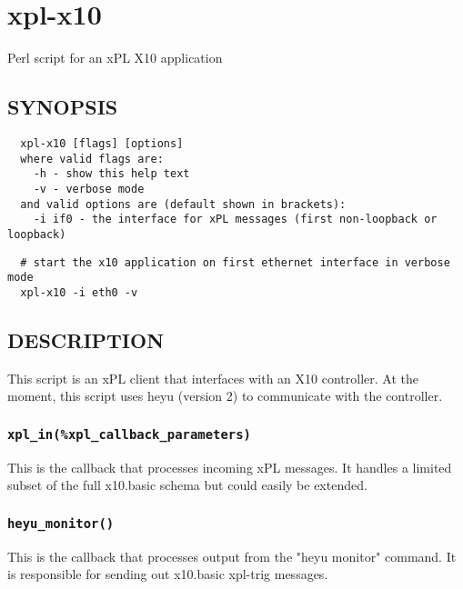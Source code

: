 \documentclass[12pt,a4paper]{article}
\begin{document}
\newpage
\section{xpl-x10\label{xpl-x10}}


Perl script for an xPL X10 application

\subsection*{SYNOPSIS\label{xpl-x10_SYNOPSIS}}
\begin{verbatim}
  xpl-x10 [flags] [options]
  where valid flags are:
    -h - show this help text
    -v - verbose mode
  and valid options are (default shown in brackets):
    -i if0 - the interface for xPL messages (first non-loopback or loopback)
\end{verbatim}
\begin{verbatim}
  # start the x10 application on first ethernet interface in verbose mode
  xpl-x10 -i eth0 -v
\end{verbatim}
\subsection*{DESCRIPTION\label{xpl-x10_DESCRIPTION}}


This script is an xPL client that interfaces with an X10 controller.
At the moment, this script uses heyu (version 2) to communicate with
the controller.

\subsubsection*{\texttt{xpl\_in(\%xpl\_callback\_parameters)}\label{xpl-x10_xpl_in_xpl_callback_parameters_}}


This is the callback that processes incoming xPL messages.  It handles
a limited subset of the full x10.basic schema but could easily be
extended.

\subsubsection*{\texttt{heyu\_monitor()}\label{xpl-x10_heyu_monitor_}}


This is the callback that processes output from the "heyu monitor"
command.  It is responsible for sending out x10.basic xpl-trig
messages.
\end{document}

